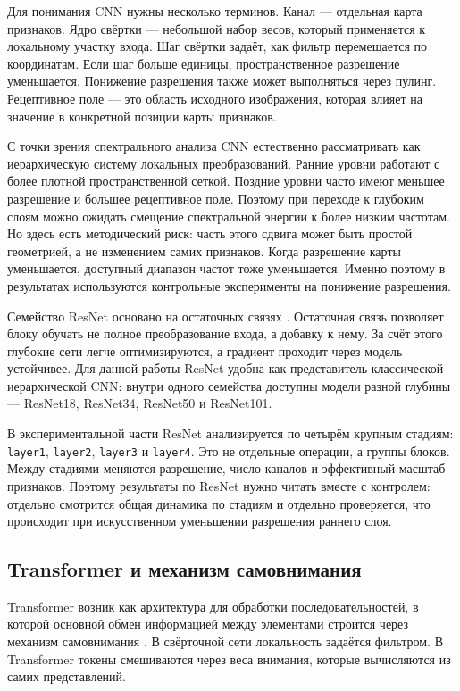 Для понимания CNN нужны несколько терминов. Канал — отдельная карта признаков. Ядро свёртки — небольшой набор весов, который применяется к локальному участку входа. Шаг свёртки задаёт, как фильтр перемещается по координатам. Если шаг больше единицы, пространственное разрешение уменьшается. Понижение разрешения также может выполняться через пулинг. Рецептивное поле — это область исходного изображения, которая влияет на значение в конкретной позиции карты признаков.

С точки зрения спектрального анализа CNN естественно рассматривать как иерархическую систему локальных преобразований. Ранние уровни работают с более плотной пространственной сеткой. Поздние уровни часто имеют меньшее разрешение и большее рецептивное поле. Поэтому при переходе к глубоким слоям можно ожидать смещение спектральной энергии к более низким частотам. Но здесь есть методический риск: часть этого сдвига может быть простой геометрией, а не изменением самих признаков. Когда разрешение карты уменьшается, доступный диапазон частот тоже уменьшается. Именно поэтому в результатах используются контрольные эксперименты на понижение разрешения.

Семейство ResNet основано на остаточных связях \cite{he2016deep}. Остаточная связь позволяет блоку обучать не полное преобразование входа, а добавку к нему. За счёт этого глубокие сети легче оптимизируются, а градиент проходит через модель устойчивее. Для данной работы ResNet удобна как представитель классической иерархической CNN: внутри одного семейства доступны модели разной глубины — ResNet18, ResNet34, ResNet50 и ResNet101.

В экспериментальной части ResNet анализируется по четырём крупным стадиям: \texttt{layer1}, \texttt{layer2}, \texttt{layer3} и \texttt{layer4}. Это не отдельные операции, а группы блоков. Между стадиями меняются разрешение, число каналов и эффективный масштаб признаков. Поэтому результаты по ResNet нужно читать вместе с контролем: отдельно смотрится общая динамика по стадиям и отдельно проверяется, что происходит при искусственном уменьшении разрешения раннего слоя.

\subsection{Transformer и механизм самовнимания}

Transformer возник как архитектура для обработки последовательностей, в которой основной обмен информацией между элементами строится через механизм самовнимания \cite{vaswani2017attention}. В свёрточной сети локальность задаётся фильтром. В Transformer токены смешиваются через веса внимания, которые вычисляются из самих представлений.

